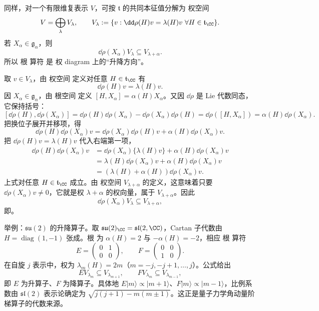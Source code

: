 同样，对一个有限维复表示 $V$，可按 $\mathfrak t$ 的共同本征值分解为 权空间
\begin{equation*}V=\bigoplus_{\lambda}V_\lambda,
\qquad
V_\lambda
:=\{v:\dd\rho(H)v=\lambda(H)v
\ \forall H\in\mathfrak t_\CC\}.\end{equation*}
若 $X_\alpha\in\mathfrak g_\alpha$，则
\begin{equation}
\boxed{
\dd\rho(X_\alpha)V_\lambda
\subseteq V_{\lambda+\alpha}.
}
\label{eq:math-lie-root-shifts-weight}
\end{equation}
所以 根 算符 是 权 diagram 上的“升降方向”。

取 $v\in V_\lambda$，由 权空间 定义对任意 $H\in\mathfrak t_\CC$ 有
\[
\dd\rho(H)v=\lambda(H)v.
\]
因 $X_\alpha\in\mathfrak g_\alpha$，由 根空间 定义 $[H,X_\alpha]=\alpha(H)X_\alpha$。又因 $\dd\rho$ 是 Lie 代数同态，它保持括号：
\[
[\dd\rho(H),\dd\rho(X_\alpha)]
=\dd\rho(H)\dd\rho(X_\alpha)-\dd\rho(X_\alpha)\dd\rho(H)
=\dd\rho([H,X_\alpha])
=\alpha(H)\dd\rho(X_\alpha).
\]
把换位子展开并移项，得
\[
\dd\rho(H)\dd\rho(X_\alpha)v
=\dd\rho(X_\alpha)\dd\rho(H)v
+\alpha(H)\dd\rho(X_\alpha)v.
\]
把 $\dd\rho(H)v=\lambda(H)v$ 代入右端第一项，
\begin{align*}
\dd\rho(H)\dd\rho(X_\alpha)v
&=\dd\rho(X_\alpha)\{\lambda(H)v\}
 +\alpha(H)\dd\rho(X_\alpha)v\\
&=\lambda(H)\dd\rho(X_\alpha)v
 +\alpha(H)\dd\rho(X_\alpha)v\\
&=(\lambda(H)+\alpha(H))\dd\rho(X_\alpha)v.
\end{align*}
上式对任意 $H\in\mathfrak t_\CC$ 成立。由 权空间 $V_{\lambda+\alpha}$ 的定义，这意味着只要 $\dd\rho(X_\alpha)v\neq0$，它就是权 $\lambda+\alpha$ 的权向量，属于 $V_{\lambda+\alpha}$。因此
\[
\dd\rho(X_\alpha)V_\lambda\subseteq V_{\lambda+\alpha},
\]
即。

举例：$\mathfrak{su}(2)$ 的升降算子。取 $\mathfrak{su}(2)_\CC=\mathfrak{sl}(2,\CC)$，Cartan 子代数由 $H=\operatorname{diag}(1,-1)$ 张成。根 为 $\alpha(H)=2$ 与 $-\alpha(H)=-2$，相应 根 算符
\[
E=\begin{pmatrix}0&1\\0&0\end{pmatrix},\qquad
F=\begin{pmatrix}0&0\\1&0\end{pmatrix}.
\]
在自旋 $j$ 表示中，权为 $\lambda_m(H)=2m$（$m=-j,-j+1,\ldots,j$）。公式给出
\[
E V_{\lambda_m}\subseteq V_{\lambda_{m+1}},\qquad
F V_{\lambda_m}\subseteq V_{\lambda_{m-1}},
\]
即 $E$ 为升算子、$F$ 为降算子。具体地 $E|m\rangle\propto|m+1\rangle$、$F|m\rangle\propto|m-1\rangle$，比例系数由 $\mathfrak{sl}(2)$ 表示论确定为 $\sqrt{j(j+1)-m(m\pm1)}$。这正是量子力学角动量阶梯算子的代数来源。


